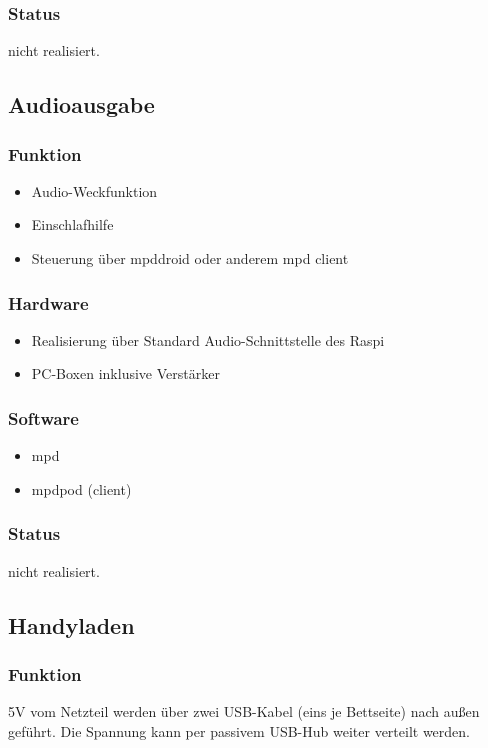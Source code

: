 \documentclass[a4paper,twoside,titlepage,normalheadings,tocleft,bibtotoc]{scrartcl}
\begin{document}
\subsubsection{Status}
nicht realisiert.

\subsection{Audioausgabe}
\subsubsection{Funktion}
\begin{itemize}
\item Audio-Weckfunktion
\item Einschlafhilfe
\item Steuerung über mpddroid oder anderem mpd client
\end{itemize}

\subsubsection{Hardware}
\begin{itemize}
\item Realisierung über Standard Audio-Schnittstelle des Raspi
\item PC-Boxen inklusive Verstärker
\end{itemize}

\subsubsection{Software}
\begin{itemize}
\item mpd
\item mpdpod (client)
\end{itemize}

\subsubsection{Status}
nicht realisiert.

\subsection{Handyladen}
\subsubsection{Funktion}
5V vom Netzteil werden über zwei USB-Kabel (eins je Bettseite) nach außen geführt. Die Spannung kann per passivem USB-Hub weiter verteilt werden.
\end{document}
